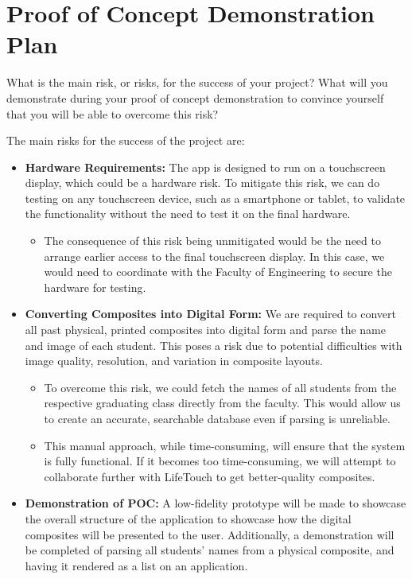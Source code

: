 \documentclass{article}
\begin{document}
\section{Proof of Concept Demonstration Plan}

What is the main risk, or risks, for the success of your project?  What will you
demonstrate during your proof of concept demonstration to convince yourself that
you will be able to overcome this risk?



The main risks for the success of the project are:

\begin{itemize}
    \item \textbf{Hardware Requirements:}  
    The app is designed to run on a touchscreen display, which could be a hardware risk. To mitigate this risk, we can do testing on any touchscreen device, such as a smartphone or tablet, to validate the functionality without the need to test it on the final hardware.
    \begin{itemize}
        \item The consequence of this risk being unmitigated would be the need to arrange earlier access to the final touchscreen display. In this case, we would need to coordinate with the Faculty of Engineering to secure the hardware for testing.
    \end{itemize}
    
    \item \textbf{Converting Composites into Digital Form:}  
    We are required to convert all past physical, printed composites into digital form and parse the name and image of each student. This poses a risk due to potential difficulties with image quality, resolution, and variation in composite layouts.
    \begin{itemize}
        \item To overcome this risk, we could fetch the names of all students from the respective graduating class directly from the faculty. This would allow us to create an accurate, searchable database even if parsing is unreliable.
        \item This manual approach, while time-consuming, will ensure that the system is fully functional. If it becomes too time-consuming, we will attempt to collaborate further with LifeTouch to get better-quality composites.
    \end{itemize}
    \item \textbf{Demonstration of POC:}  
    A low-fidelity prototype will be made to showcase the overall structure of the application to showcase how the digital composites will be presented to the user. Additionally, a demonstration will be completed of parsing all students’ names from a physical composite, and having it rendered as a list on an application.
\end{itemize}
\end{document}
